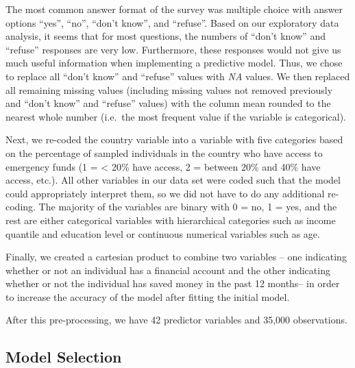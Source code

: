 \documentclass[water,article,submit,moreauthors,pdftex]{mdpi}
\begin{document}
The most common answer format of the survey was multiple choice with
answer options ``yes'', ``no'', ``don't know'', and ``refuse''. Based on
our exploratory data analysis, it seems that for most questions, the
numbers of ``don't know'' and ``refuse'' responses are very low.
Furthermore, these responses would not give us much useful information
when implementing a predictive model. Thus, we chose to replace all
``don't know'' and ``refuse'' values with \emph{NA} values. We then
replaced all remaining missing values (including missing values not
removed previously and ``don't know'' and ``refuse'' values) with the
column mean rounded to the nearest whole number (i.e.~the most frequent
value if the variable is categorical).

Next, we re-coded the country variable into a variable with five
categories based on the percentage of sampled individuals in the country
who have access to emergency funds (1 = \textless{} 20\% have access, 2
= between 20\% and 40\% have access, etc.). All other variables in our
data set were coded such that the model could appropriately interpret
them, so we did not have to do any additional re-coding. The majority of
the variables are binary with 0 = no, 1 = yes, and the rest are either
categorical variables with hierarchical categories such as income
quantile and education level or continuous numerical variables such as
age.

Finally, we created a cartesian product to combine two variables -- one
indicating whether or not an individual has a financial account and the
other indicating whether or not the individual has saved money in the
past 12 months-- in order to increase the accuracy of the model after
fitting the initial model.

After this pre-processing, we have 42 predictor variables and 35,000
observations.

\hypertarget{model-selection}{%
\subsection{Model Selection}\label{model-selection}}
\end{document}
